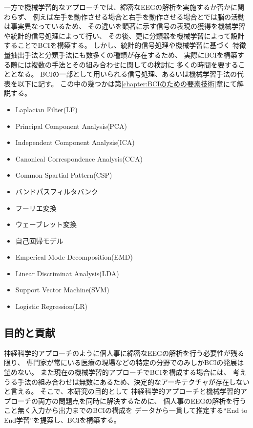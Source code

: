 一方で機械学習的なアプローチでは、綿密なEEGの解析を実施するか否かに関わらず、
例えば左手を動作させる場合と右手を動作させる場合とでは脳の活動は事実異なっているため、
その違いを顕著に示す信号の表現の獲得を機械学習や統計的信号処理によって行い、
その後、更に分類器を機械学習によって設計することでBCIを構築する。
しかし、統計的信号処理や機械学習に基づく
特徴量抽出手法と分類手法にも数多くの種類が存在するため、
実際にBCIを構築する際には複数の手法とその組み合わせに関しての検討に
多くの時間を要することとなる。
BCIの一部として用いられる信号処理、あるいは機械学習手法の代表を以下に記す。
この中の幾つかは第\ref{chapter:BCIのための要素技術}章にて解説する。
\begin{itemize}
    \item Laplacian Filter(LF)
    \item Principal Component Analysis(PCA)
    \item Independent Component Analysis(ICA)
    \item Canonical Correspondence Analysis(CCA)
    \item Common Spartial Pattern(CSP)
    \item バンドパスフィルタバンク
    \item フーリエ変換
    \item ウェーブレット変換
    \item 自己回帰モデル
    \item Emperical Mode Decomposition(EMD)
    \item Linear Discriminat Analysis(LDA)
    \item Support Vector Machine(SVM)
    \item Logistic Regression(LR)
\end{itemize}

\subsection{\mc 目的と貢献}
神経科学的アプローチのように個人事に綿密なEEGの解析を行う必要性が残る限り、
専門家が常にいる医療の現場などの特定の分野でのみしかBCIの発展は望めない。
また現在の機械学習的アプローチでBCIを構成する場合には、
考えうる手法の組み合わせは無数にあるため、決定的なアーキテクチャが存在しないと言える。
そこで、本研究の目的として
神経科学的アプローチと機械学習的アプローチの両方の問題点を同時に解決するために、
個人事のEEGの解析を行うこと無く入力から出力までのBCIの構成を
データから一貫して推定する``End to End学習''を提案し、BCIを構築する。

